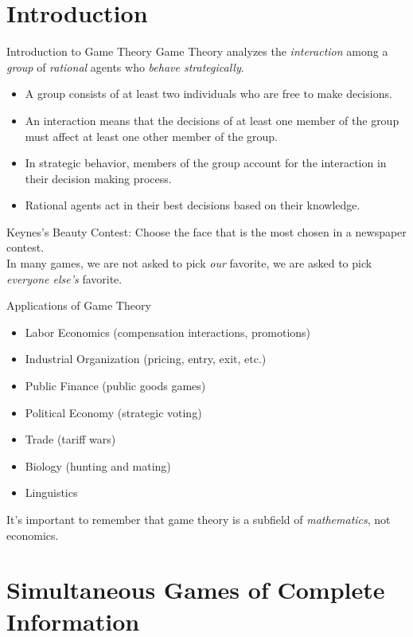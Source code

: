 \documentclass[10pt]{extarticle}
\title{}
\author{Avinash Iyer}
\date{}
\begin{document}
  \section*{Introduction}%
  
  \begin{problem}{Introduction to Game Theory}
    Game Theory analyzes the \textit{interaction} among a \textit{group} of \textit{rational} agents who \textit{behave strategically}.
    \begin{itemize}
      \item A group consists of at least two individuals who are free to make decisions.
      \item An interaction means that the decisions of at least one member of the group must affect at least one other member of the group.
      \item In strategic behavior, members of the group account for the interaction in their decision making process.
      \item Rational agents act in their best decisions based on their knowledge.
    \end{itemize}
    Keynes's Beauty Contest: Choose the face that is the most chosen in a newspaper contest.\\

    In many games, we are not asked to pick \textit{our} favorite, we are asked to pick \textit{everyone else's} favorite.
    \begin{problem}{Applications of Game Theory}
      \begin{itemize}
        \item Labor Economics (compensation interactions, promotions)
        \item Industrial Organization (pricing, entry, exit, etc.)
        \item Public Finance (public goods games)
        \item Political Economy (strategic voting)
        \item Trade (tariff wars)
        \item Biology (hunting and mating)
        \item Linguistics
      \end{itemize}
    \end{problem}
    It's important to remember that game theory is a subfield of \textit{mathematics}, not economics.
  \end{problem}
  \section*{Simultaneous Games of Complete Information}%
  
\end{document}
